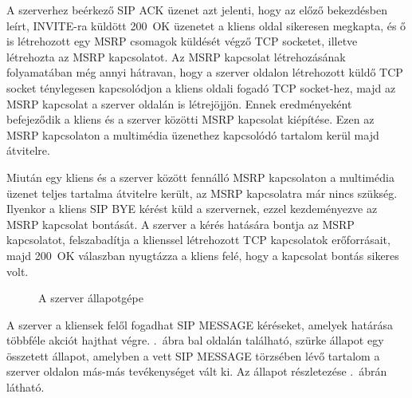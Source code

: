 A szerverhez beérkező SIP ACK üzenet azt jelenti, hogy az előző bekezdésben leírt, INVITE-ra küldött 200~OK üzenetet a kliens oldal sikeresen megkapta, és ő is létrehozott egy MSRP csomagok küldését végző TCP socketet, illetve létrehozta az MSRP kapcsolatot. Az MSRP kapcsolat létrehozásának folyamatában még annyi hátravan, hogy a szerver oldalon létrehozott küldő TCP socket ténylegesen kapcsolódjon a kliens oldali fogadó TCP socket-hez, majd az MSRP kapcsolat a szerver oldalán is létrejöjjön. Ennek eredményeként befejeződik a kliens és a szerver közötti MSRP kapcsolat kiépítése. Ezen az MSRP kapcsolaton a multimédia üzenethez kapcsolódó tartalom kerül majd átvitelre.

Miután egy kliens és a szerver között fennálló MSRP kapcsolaton a multimédia üzenet teljes tartalma átvitelre került, az MSRP kapcsolatra már nincs szükség. Ilyenkor a kliens SIP BYE kérést küld a szervernek, ezzel kezdeményezve az MSRP kapcsolat bontását. A szerver a kérés hatására bontja az MSRP  kapcsolatot, felszabadítja a klienssel létrehozott TCP kapcsolatok erőforrásait, majd 200~OK válaszban nyugtázza a kliens felé, hogy a kapcsolat bontás sikeres volt.

\begin{figure}[htbp]
\center
{}
\caption{A szerver állapotgépe}
\label{fig:server_statemachine_full}
\end{figure}

A szerver a kliensek felől fogadhat SIP MESSAGE kéréseket, amelyek határása többféle akciót hajthat végre. .~ábra bal oldalán található, szürke állapot egy összetett állapot, amelyben a vett SIP MESSAGE törzsében lévő tartalom a szerver oldalon más-más tevékenységet vált ki. Az állapot részletezése .~ábrán látható.

